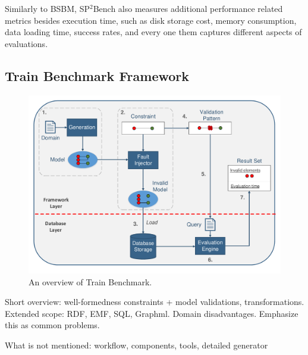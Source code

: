 Similarly to BSBM, SP$^2$Bench also measures additional performance related metrics besides execution time, such as disk storage cost, memory consumption, data loading time, success rates, and every one them captures different aspects of evaluations.


\subsection{Train Benchmark Framework}\label{sec:train}

\begin{figure}[!ht]
	\centering
	\includegraphics[width=150mm, keepaspectratio]{figures/functionality.pdf}
	\caption{An overview of Train Benchmark.}
	\label{fig:functionality}
\end{figure}

Short overview: well-formedness constraints + model validations, transformations.\\
Extended scope: RDF, EMF, SQL, Graphml.
Domain disadvantages. Emphasize this as common problems.

What is not mentioned: workflow, components, tools, detailed generator



